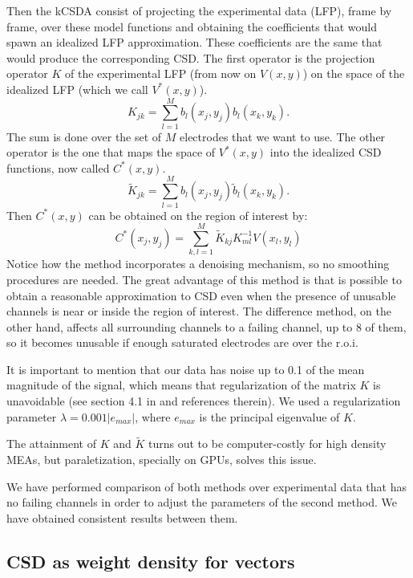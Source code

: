 \documentclass[12pt]{article}
\begin{document}
Then the kCSDA consist of projecting the experimental data (LFP), frame by frame,
over these model functions and obtaining the  coefficients that would spawn an idealized
LFP approximation. These coefficients are the same that would produce the
corresponding CSD. The first operator is the projection operator $K$ of the experimental
LFP (from now on $V(x,y)$) on the space of the idealized LFP (which we call $V^* (x,y)$).
\begin{equation}
  K_{jk}=\sum_{l=1}^{M}b_l(x_j,y_j)b_l(x_k,y_k).
\end{equation}
The sum is done over the set of $M$ electrodes that we want to use.
The other operator is the one that maps the space of $V^*(x,y)$ into the idealized
CSD functions, now called $C^*(x,y)$. 
\begin{equation}
  \tilde{K}_{jk}=\sum_{l=1}^Mb_l(x_j,y_j)\tilde{b}_l(x_k,y_k).
\end{equation}
Then $C^*(x,y)$ can be obtained on the region of interest by:
\begin{equation}
  C^*(x_j,y_j)=\sum_{k,l=1}^M \tilde{K}_{kj} K^{-1}_{ml} V(x_l,y_l)
\end{equation}
Notice how the method incorporates a denoising mechanism, so
no smoothing procedures are needed.
The great advantage of this method is that is possible to obtain a reasonable
approximation to CSD even when the presence of unusable channels is near or inside
the region of interest. The difference method, on the other hand, affects all surrounding
channels to a failing channel, up to 8 of them, so it becomes unusable if enough
saturated electrodes are over the r.o.i.

It is important to mention that our data has noise up to 0.1 of the mean magnitude of the
signal, which means that regularization of the matrix $K$ is unavoidable (see section 4.1 in \cite{Potworowski2011} and references therein). We used a regularization parameter $\lambda=0.001 |e_{max}|$, where $e_{max}$ is the principal eigenvalue of $K$. 

The attainment of $K$ and $\tilde{K}$ turns out to be computer-costly for high density MEAs, but paraletization, specially on
GPUs, solves this issue.

We have performed comparison of both methods over experimental data that has
no failing channels in order to adjust the parameters of the second method. We
have obtained consistent results between them.



\subsection{CSD as weight density for vectors}
\end{document}
